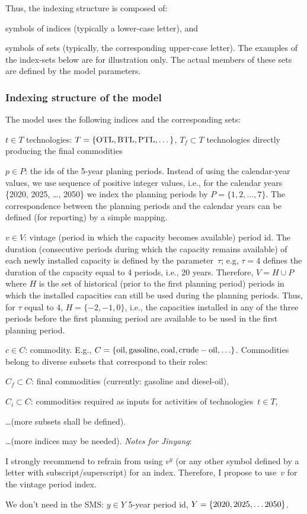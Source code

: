 \documentclass[a4paper,12pt]{article}
\begin{document}
Thus, the indexing structure is composed of:
\btlb
\item symbols of indices (typically a lower-case letter), and
\item symbols of sets (typically, the corresponding upper-case letter).
\etl
The examples of the index-sets below are for illustration only.
The actual members of these sets are defined by the model parameters.

\subsubsection{Indexing structure of the model}\label{sec:index}
The model uses the following indices and the corresponding sets:
\btlb
\item $t \in T$ technologies: $T = \{ {\rm OTL, BTL, PTL,} \dots \}$,
	$T_f \subset T$ technologies directly producing the final commodities
\item $p \in P$: the ids of the 5-year planing periods.
	Instead of using the calendar-year values, we use sequence of positive integer
	values, i.e., for the calendar years \{2020, 2025, \dots, 2050\} we index
	the planning periods by $P = \{1, 2, \dots, 7\}$.
	The correspondence between the planning periods and the calendar years
	can be defined (for reporting) by a simple mapping.
\item $v \in V$: vintage (period in which the capacity becomes available) period id.
	The duration (consecutive periods during which the capacity remains available)
	of each newly installed capacity is defined by the parameter~$\tau$;
	e.g, $\tau = 4$ defines the duration of the capacity equal to 4 periods,
	i.e., 20 years.
	Therefore, $V = H \cup P$ where $H$ is the set of historical (prior to the
	first planning period) periods in which the installed capacities can still
	be used during the planning periods.
	Thus, for $\tau$ equal to 4, $H = \{-2, -1, 0\}$, i.e., the capacities
	installed in any of the three periods before the first planning period
	are available to be used in the first planning period.
\item $c \in C$: commodity. E.g.,
	$C = \{ {\rm oil, gasoline, coal, crude-oil, \dots } \}$.
	Commodities belong to diverse subsets that correspond to their roles:
	\btlas{$\diamond$}
	\item $C_f \subset C$: final commodities (currently: gasoline and diesel-oil),
	\item $C_i \subset C$: commodities required as inputs for activities of
		technologies~$t \in T$,
	\item \dots  (more subsets shall be defined).
	\etls
\item \dots (more indices may be needed).
\etl
{\em Notes for Jinyang}:
\btlb
\item I strongly recommend to refrain from using $v^y$ (or any other symbol defined
	by a letter with subscript/superscript) for an index.
	Therefore, I propose to use~$v$ for the vintage period index.
\item We don't need in the SMS:
	$y \in Y$ 5-year period id, $Y = \{ {\rm 2020, 2025, \dots 2050} \}$.
\etl
\end{document}
